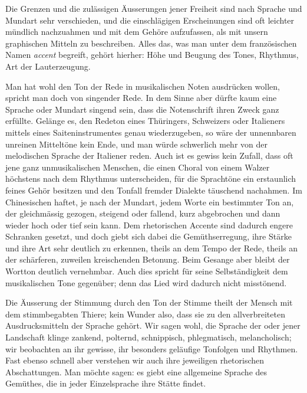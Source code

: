 Die Grenzen und die zulässigen Äusserungen jener Freiheit sind nach Sprache und Mundart sehr verschieden, und die einschlägigen Erscheinungen sind oft leichter mündlich nachzuahmen und mit dem Gehöre aufzufassen, als mit unsern graphischen Mitteln zu beschreiben. Alles das, was man unter dem französischen Namen \textit{accent} begreift, gehört hierher: Höhe und Beugung des Tones, Rhythmus, Art der Lauterzeugung. 

Man hat wohl den Ton der Rede in musikalischen Noten ausdrücken wollen, spricht man doch von singender Rede. In dem Sinne aber dürfte kaum eine Sprache oder Mundart singend sein, dass die Notenschrift ihren Zweck ganz erfüllte. Gelänge es, den Redeton eines Thüringers, \label{fp.362} Schweizers oder Italieners mittels eines Saiteninstrumentes genau wiederzugeben, so wäre der unnennbaren unreinen Mitteltöne kein Ende, und man würde schwerlich mehr von der melodischen Sprache der Italiener reden. Auch ist es gewiss kein Zufall, dass oft jene ganz unmusikalischen Menschen, die einen Choral von einem Walzer höchstens nach dem Rhythmus unterscheiden, für die Sprachtöne ein erstaunlich feines Gehör besitzen und den Tonfall fremder Dialekte täuschend nachahmen. Im Chinesischen haftet, je nach der Mundart, jedem Worte ein bestimmter Ton an, der gleichmässig gezogen, steigend oder fallend, kurz abgebrochen und dann wieder hoch oder tief sein kann. Dem rhetorischen Accente sind dadurch engere Schranken gesetzt, und doch giebt sich dabei die Gemüthserregung, ihre Stärke und ihre Art sehr deutlich zu erkennen, theils an dem Tempo der Rede, theils an der schärferen, zuweilen kreischenden Betonung. Beim Gesange aber bleibt der Wortton deutlich vernehmbar. Auch dies spricht für seine Selbständigkeit dem musikalischen Tone gegenüber; denn das Lied wird dadurch nicht misstönend.

Die Äusserung der Stimmung durch den Ton der Stimme theilt der Mensch mit dem stimmbegabten Thiere; kein Wunder also, dass sie zu den allverbreiteten Ausdrucksmitteln der Sprache gehört. Wir sagen wohl, die Sprache der oder jener Landschaft klinge zankend, polternd, schnippisch, phlegmatisch, melancholisch; wir beobachten an ihr gewisse, ihr besonders geläufige Tonfolgen und \label{sp.378} Rhythmen. Fast ebenso schnell aber verstehen wir auch ihre jeweiligen rhetorischen Abschattungen. Man möchte sagen: es giebt eine allgemeine Sprache des Gemüthes, die in jeder Einzelsprache ihre Stätte findet.

